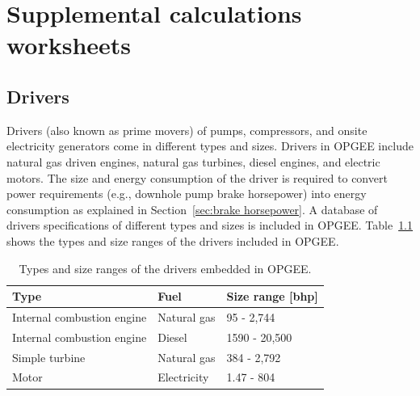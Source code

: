 \documentclass[11pt]{report}
\begin{document}
\begin{landscape}
\begin{tiny}
\begin{threeparttable}
\begin{supertabular*}{1\columnwidth}{p{0.05\columnwidth}p{0.25\columnwidth}p{0.25\columnwidth}p{0.05\columnwidth}p{0.05\columnwidth}p{0.05\columnwidth}p{0.05\columnwidth}p{0.05\columnwidth}}
\end{supertabular*}
\end{threeparttable}
\end{tiny}

\end{landscape}


\clearpage


\chapter{Supplemental calculations worksheets}


\section{Drivers} \label{sec:drivers}

Drivers (also known as prime movers) of pumps, compressors, and onsite electricity generators come in different types and sizes. Drivers in OPGEE include natural gas driven engines, natural gas turbines, diesel engines, and electric motors. The size and energy consumption of the driver is required to convert power requirements (e.g., downhole pump brake horsepower) into energy consumption as explained in Section \,\ref{sec:brake horsepower}. A database of drivers specifications of different types and sizes is included in OPGEE. Table \,\ref{tab:drivers_size} shows the types and size ranges of the drivers included in OPGEE.
\begin{table}
\begin{scriptsize}
\caption{Types and size ranges of the drivers embedded in OPGEE.}
\label{tab:drivers_size}
\begin{tabular*}{1\columnwidth}{p{}p{}p{}}
\toprule
Type & Fuel & Size range [bhp] \\
\midrule
Internal combustion engine & Natural gas & 95 - 2,744 \\
Internal combustion engine & Diesel & 1590 - 20,500 \\
Simple turbine & Natural gas & 384 - 2,792 \\
Motor & Electricity & 1.47 - 804 \\
\bottomrule
\end{tabular*}
\end{scriptsize}
\end{table}
\end{document}
